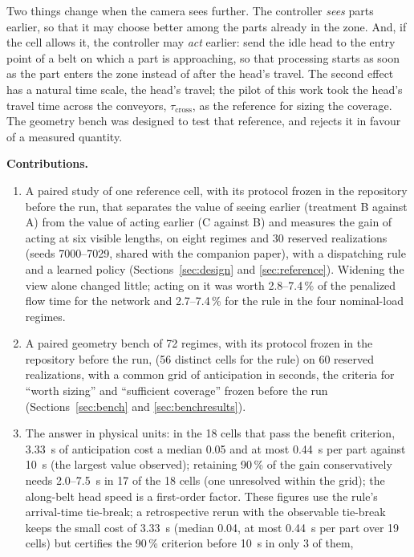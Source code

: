 \documentclass[11pt,a4paper]{article}
\newcommand{\tcross}{\tau_{\mathrm{cross}}}
\begin{document}
Two things change when the camera sees further. The controller \emph{sees} parts earlier,
so that it may choose better among the parts already in the zone. And, if the cell allows
it, the controller may \emph{act} earlier: send the idle head to the entry point of a belt
on which a part is approaching, so that processing starts as soon as the part enters the
zone instead of after the head's travel. The second effect has a natural time scale, the
head's travel; the pilot of this work took the head's travel time across the conveyors,
$\tcross$, as the reference for sizing the coverage. The geometry bench was designed to
test that reference, and rejects it in favour of a measured quantity.

\textbf{Contributions.}
\begin{enumerate}[nosep]
\item A paired study of one reference cell, with its protocol frozen in the repository before the run, that separates the value of
  seeing earlier (treatment B against A) from the value of acting earlier (C against B)
  and measures the gain of acting at six visible lengths, on eight regimes and 30
  reserved realizations (seeds 7000--7029, shared with the companion paper), with a dispatching rule and a learned policy
  (Sections~\ref{sec:design} and \ref{sec:reference}). Widening the view alone changed
  little; acting on it was worth 2.8--7.4\,\% of the penalized flow time for the network
  and 2.7--7.4\,\% for the rule in the four nominal-load regimes.
\item A paired geometry bench of 72 regimes, with its protocol frozen in the repository before the run, (56 distinct cells for the
  rule) on 60 reserved realizations, with a common grid of anticipation in seconds, the
  criteria for ``worth sizing'' and ``sufficient coverage'' frozen before the run
  (Sections~\ref{sec:bench} and \ref{sec:benchresults}).
\item The answer in physical units: in the 18 cells that pass the benefit criterion, 3.33~s
  of anticipation cost a median 0.05 and at most 0.44~s per part against 10~s (the
  largest value observed);
  retaining 90\,\% of the gain conservatively needs 2.0--7.5~s in 17 of the 18 cells (one
  unresolved within the grid); the along-belt head speed is a first-order factor. These
  figures use the rule's arrival-time tie-break; a retrospective rerun with the
  observable tie-break keeps the small cost of 3.33~s (median 0.04, at most 0.44~s per
  part over 19 cells) but certifies the 90\,\% criterion before 10~s in only 3 of them,

\end{enumerate}
\end{document}
